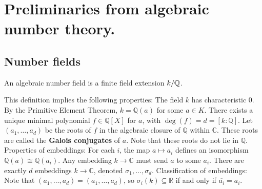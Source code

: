 \section{Preliminaries from algebraic number theory.}

\subsection{Number fields}
\begin{outline}
    \begin{definition}
        An algebraic number field is a finite field extension $k/\mathbb{Q}$. 
    \end{definition}
        \1 This definition implies the following properties:
            \2 The field $k$ has characteristic 0.
            \2 By the Primitive Element Theorem, $k = \mathbb{Q}(a)$ for some $a \in K$.
            \2 There exists a unique minimal polynomial $f \in \mathbb{Q}[X]$ for $a$, with $\deg(f) = d = [k:\mathbb{Q}]$.
        \1 Let $(a_1, \ldots, a_d)$ be the roots of $f$ in the algebraic closure of $\mathbb{Q}$ within $\mathbb{C}$. These roots are called the \textbf{Galois conjugates} of $a$. Note that these roots do not lie in $\mathbb{Q}$.
        \1 Properties of embeddings:
            \2 For each $i$, the map $a \mapsto a_i$ defines an isomorphism $\mathbb{Q}(a) \cong \mathbb{Q}(a_i)$.
            \2 Any embedding $k\rightarrow \mathbb{C}$ must send $a$ to some $a_i$.
            \2 There are exactly $d$ embeddings $k \rightarrow \mathbb{C}$, denoted $\sigma_1, \ldots, \sigma_d$.
        \1 Classification of embeddings:        
            \2 Note that $(a_1, \ldots, a_d) = \overline{(a_1, \ldots, a_d)}$, so $\sigma_i(k) \subseteq \mathbb{R}$ if and only if $\overline{a_i} = a_i$.

\end{outline}
